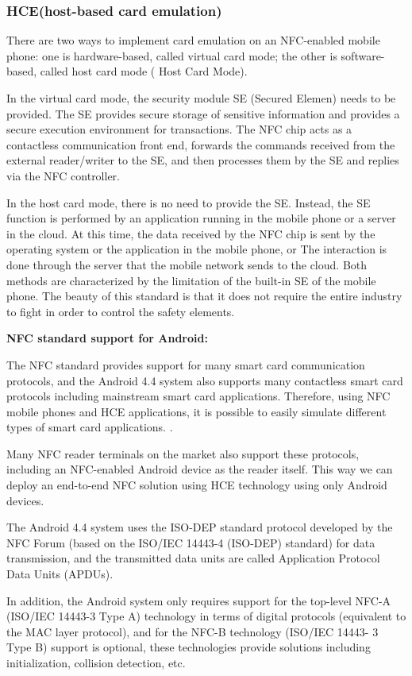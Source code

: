 \documentclass[journal]{IEEEtran}
\begin{document}
\subsubsection{HCE(host-based card emulation)}

There are two ways to implement card emulation on an NFC-enabled mobile phone: one is hardware-based, called virtual card mode; the other is software-based, called host card mode ( Host Card Mode).

In the virtual card mode, the security module SE (Secured Elemen) needs to be provided. The SE provides secure storage of sensitive information and provides a secure execution environment for transactions. The NFC chip acts as a contactless communication front end, forwards the commands received from the external reader/writer to the SE, and then processes them by the SE and replies via the NFC controller.

In the host card mode, there is no need to provide the SE. Instead, the SE function is performed by an application running in the mobile phone or a server in the cloud. At this time, the data received by the NFC chip is sent by the operating system or the application in the mobile phone, or The interaction is done through the server that the mobile network sends to the cloud. Both methods are characterized by the limitation of the built-in SE of the mobile phone. The beauty of this standard is that it does not require the entire industry to fight in order to control the safety elements.

\textbf{NFC standard support for Android:}

The NFC standard provides support for many smart card communication protocols, and the Android 4.4 system also supports many contactless smart card protocols including mainstream smart card applications. Therefore, using NFC mobile phones and HCE applications, it is possible to easily simulate different types of smart card applications. .

Many NFC reader terminals on the market also support these protocols, including an NFC-enabled Android device as the reader itself. This way we can deploy an end-to-end NFC solution using HCE technology using only Android devices.

The Android 4.4 system uses the ISO-DEP standard protocol developed by the NFC Forum (based on the ISO/IEC 14443-4 (ISO-DEP) standard) for data transmission, and the transmitted data units are called Application Protocol Data Units (APDUs).

In addition, the Android system only requires support for the top-level NFC-A (ISO/IEC 14443-3 Type A) technology in terms of digital protocols (equivalent to the MAC layer protocol), and for the NFC-B technology (ISO/IEC 14443- 3 Type B) support is optional, these technologies provide solutions including initialization, collision detection, etc.
\end{document}
